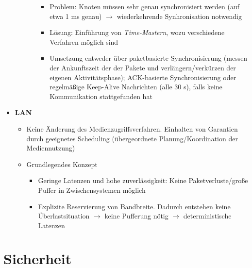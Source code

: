 \begin{itemize}
\begin{itemize}
\begin{itemize}
			\begin{itemize}
				\item Problem: Knoten müssen sehr genau synchronisiert werden (auf etwa 1 ms genau) \(\rightarrow\) wiederkehrende Synhronisation notwendig
				\item Lösung: Einführung von \textit{Time-Mastern}, wozu verschiedene Verfahren möglich sind
				\item Umsetzung entweder über paketbasierte Synchronisierung (messen der Ankunftszeit der der Pakete und verlängern/verkürzen der eigenen Aktivitätsphase); ACK-basierte Synchronisierung oder regelmäßige Keep-Alive Nachrichten (alle 30 s), falls keine Kommunikation stattgefunden hat
			\end{itemize}
		\end{itemize}
	\end{itemize}
	\item \textbf{LAN}
	\begin{itemize}
		\item Keine Änderung des Medienzugriffsverfahren. Einhalten von Garantien durch geeignetes Scheduling (übergeordnete Planung/Koordination der Mediennutzung)
		\item Grundlegendes Konzept
		\begin{itemize}
			\item Geringe Latenzen und hohe zuverlässigkeit: Keine Paketverluste/große Puffer in Zwischensystemen möglich
			\item Explizite Reservierung von Bandbreite. Dadurch entstehen keine Überlastsituation \(\rightarrow\) keine Pufferung nötig \(\rightarrow\) deterministische Latenzen
		\end{itemize}
	\end{itemize}
\end{itemize}


\section{Sicherheit}
